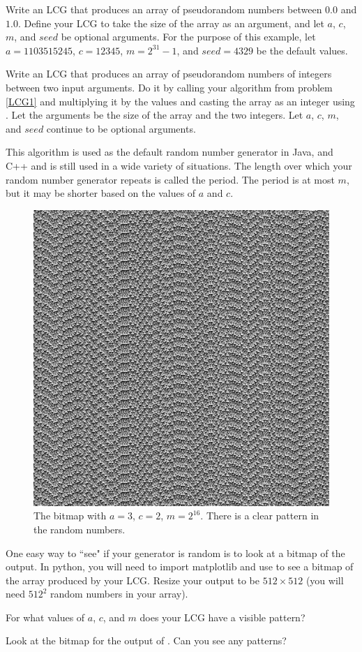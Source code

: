 \begin{problem}\label{LCG1}
Write an LCG that produces an array of pseudorandom numbers between $0.0$ and $1.0$.
Define your LCG to take the size of the array as an argument, and let $a$, $c$, $m$, and $seed$ be optional arguments.
For the purpose of this example, let $a=1103515245$, $c=12345$, $m=2^{31}-1$, and $seed=4329$ be the default values.
\end{problem}

\begin{problem}
Write an LCG that produces an array of pseudorandom numbers of integers between two input arguments.
Do it by calling your algorithm from problem \ref{LCG1} and multiplying it by the values and casting the array as an integer using .
Let the arguments be the size of the array and the two integers.
Let $a$, $c$, $m$, and $seed$ continue to be optional arguments.
\end{problem}

This algorithm is used as the default random number generator in Java, and C++ and is still used in a wide variety of situations.
The length over which your random number generator repeats is called the period.
The period is at most $m$, but it may be shorter based on the values of $a$ and $c$.

\begin{figure}
\includegraphics[width=.4\textwidth]{PRNG1.png}
\caption{
The bitmap with $a=3$, $c=2$, $m=2^{16}$.
There is a clear pattern in the random numbers.}
\end{figure}

One easy way to ``see" if your generator is random is to look at a bitmap of the output.
In python, you will need to import matplotlib and use  to see a bitmap of the array produced by your LCG.
Resize your output to be $512 \times 512$ (you will need $512^2$ random numbers in your array).



\begin{problem}
For what values of $a$, $c$, and $m$ does your LCG have a visible pattern?

Look at the bitmap for the output of .
Can you see any patterns?
\end{problem}



